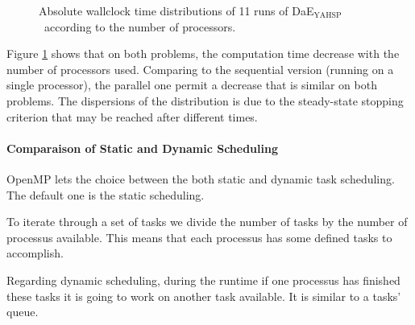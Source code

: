 \documentclass{sig-alternate}
\newcommand{\DAEYAHSP}{{\sc DaE$_{\text{YAHSP}}$}}
\begin{document}
\begin{figure}[htpb]
  \begin{center}
    \hfill
  \end{center}
  \caption{Absolute wallclock time distributions of 11 runs of \DAEYAHSP\ according to the number of processors.}
  \label{fig:proc_elevators_vs_openstacks}
\end{figure}

Figure \ref{fig:proc_elevators_vs_openstacks} shows that on both problems, the
computation time decrease with the number of processors used. Comparing to the
sequential version (running on a single processor), the parallel one permit a
decrease that is similar on both problems. The dispersions of the distribution 
is due to the steady-state stopping criterion that may be reached after different
times.

\paragraph{Comparaison of Static and Dynamic Scheduling} %

OpenMP lets the choice between the both static and dynamic task scheduling. The default one is the static scheduling.


To iterate through a set of tasks we divide the number of tasks by the number of processus available. This means that each processus has some defined tasks to accomplish.


Regarding dynamic scheduling, during the runtime if one processus has finished these tasks it is going to work on another task available. It is similar to a tasks' queue.
\end{document}
